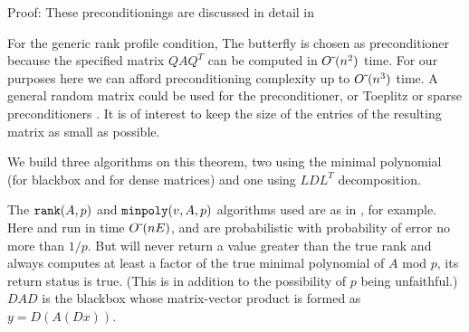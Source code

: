 \documentclass{acm_proc_article-sp}
\begin{document}
Proof:  These preconditionings are discussed in detail in \cite{CEKSTV02} \QED

For the generic rank profile condition, The butterfly is chosen as preconditioner
because the specified matrix $QAQ^T$ can be computed in ${O\mskip1mu\tilde{\,}\mskip1mu}(n^2)$ time.  
For our purposes here we can afford preconditioning complexity up to ${O\mskip1mu\tilde{\,}\mskip1mu}(n^3)$ time.
A general random matrix could be used for the preconditioner, or Toeplitz \cite{KS91} or sparse
preconditioners \cite[Section 6]{CEKSTV02}.
It is of interest to keep the size of the entries of the resulting matrix as small as
possible.

We build three algorithms on this theorem, two using the minimal polynomial (for blackbox
and for dense matrices) and one using $LDL^T$ decomposition.


The $\mbox{\tt rank}(A, p)$ and $\mbox{\tt minpoly}(v, A, p)$ algorithms 
used are as in \cite{Wie86, KS91, CEKSTV02}, for example.  
Here \minpoly{} and \rank{} run in time ${O\mskip1mu\tilde{\,}\mskip1mu}(nE)$, and 
are probabilistic with probability
of error no more than $1/p$.  But \rank{} will never return a value
greater than the true rank and \minpoly{} always computes at least a factor
of the true minimal polynomial of $A$ mod $p$, its return status is true. 
(This is in addition to the possibility of $p$ being unfaithful.) 
$DAD$ is the blackbox whose matrix-vector product is formed as $y = D(A(Dx))$.
\end{document}
